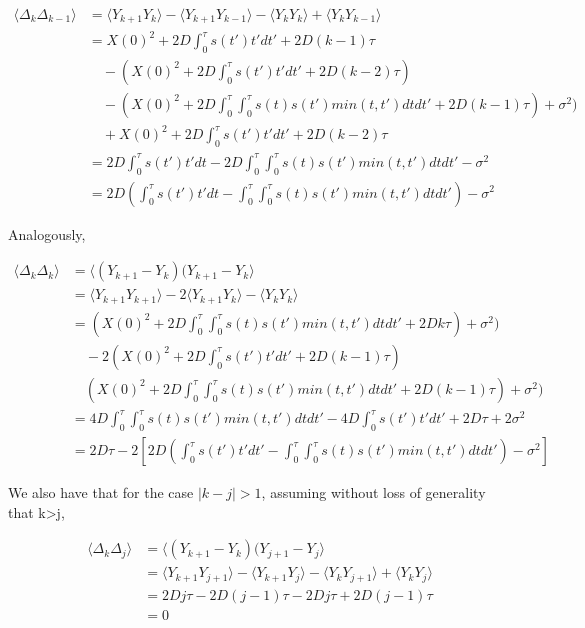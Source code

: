 \documentclass[ba]{imsart}\usepackage[]{graphicx}\usepackage[]{xcolor}
\numberwithin{equation}{section}
\theoremstyle{plain}
\begin{document}
\begin{supplement}
$$
\begin{aligned}
\langle \Delta_{k} \Delta_{k-1} \rangle &= \langle Y_{k+1}Y_{k} \rangle - \langle Y_{k+1}Y_{k-1} \rangle - \langle Y_{k}Y_{k} \rangle + \langle Y_{k}Y_{k-1} \rangle \\
 &=  X(0)^2 +2D\int_{0}^{\tau} s(t') t' dt'+ 2D (k-1)\tau  \\
     &\quad - (X(0)^2 +2D \int_{0}^{\tau} s(t') t' dt'+ 2D (k-2)\tau)  \\
     &\quad - (X(0)^2  + 2D \int_{0}^{\tau} \int_{0}^{\tau} s(t) s(t') min(t,t') dt dt'+ 2D (k-1)\tau)  + \sigma^2 ) \\
     &\quad + X(0)^2 +2D\int_{0}^{\tau} s(t') t' dt'+ 2D (k-2)\tau \\
 &= 2D\int_{0}^{\tau} s(t') t' dt - 2D \int_{0}^{\tau} \int_{0}^{\tau} s(t) s(t') min(t,t') dt dt' -   \sigma^2 \\
 &= 2D \left( \int_{0}^{\tau} s(t') t' dt - \int_{0}^{\tau} \int_{0}^{\tau} s(t) s(t') min(t,t') dt dt' \right)  -   \sigma^2
\end{aligned}
$$

Analogously,

$$
\begin{aligned}
\langle \Delta_{k} \Delta_{k} \rangle &= \langle (Y_{k+1}-Y_{k})(Y_{k+1}-Y_{k} \rangle \\
 &= \langle Y_{k+1}Y_{k+1} \rangle - 2 \langle Y_{k+1}Y_{k} \rangle - \langle Y_{k}Y_{k} \rangle \\
 &=  (X(0)^2  + 2D \int_{0}^{\tau} \int_{0}^{\tau} s(t) s(t') min(t,t') dt dt'+ 2Dk \tau)  + \sigma^2 )  \\
     &\quad - 2 \left( X(0)^2 +2D\int_{0}^{\tau} s(t') t' dt'+ 2D (k-1)\tau \right)  \\
     &\quad (X(0)^2  + 2D \int_{0}^{\tau} \int_{0}^{\tau} s(t) s(t') min(t,t') dt dt'+ 2D(k-1) \tau)  + \sigma^2 ) \\
  &= 4D \int_{0}^{\tau} \int_{0}^{\tau} s(t) s(t') min(t,t') dt dt' - 4D\int_{0}^{\tau} s(t') t' dt' + 2D\tau + 2\sigma^2 \\
  &= 2D\tau - 2 \left[ 2D \left( \int_{0}^{\tau} s(t') t' dt' - \int_{0}^{\tau} \int_{0}^{\tau} s(t) s(t') min(t,t') dt dt' \right) - \sigma^2 \right]
\end{aligned}
$$

We also have that for the case $|k-j|>1$, assuming without loss of generality
 that k>j,

$$
\begin{aligned}
\langle \Delta_{k} \Delta_{j} \rangle &= \langle (Y_{k+1}-Y_{k})(Y_{j+1}-Y_{j} \rangle \\
 &= \langle Y_{k+1}Y_{j+1} \rangle - \langle Y_{k+1}Y_{j} \rangle - \langle Y_{k}Y_{j+1} \rangle + \langle Y_{k}Y_{j} \rangle \\
 &= 2Dj \tau  - 2D (j-1)\tau - 2Dj \tau  + 2D (j-1) \tau  \\
  &= 0
\end{aligned}
$$


\end{supplement}
\end{document}
